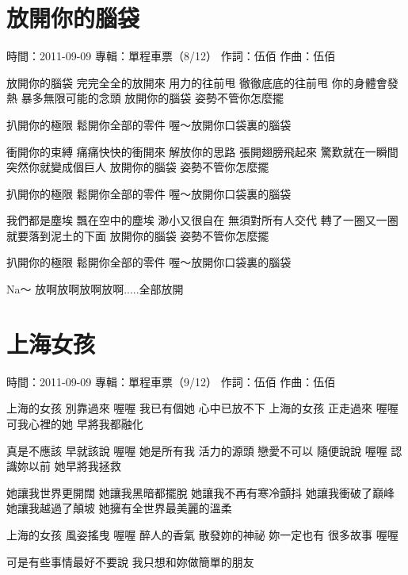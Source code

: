 \documentclass[UTF8,a4paper,oneside,twocolumn,12pt]{ctexbook}
\newcommand{\infopair}[2]{\textbullet #1：#2}
\newcommand{\zc}[1][伍佰]{\infopair{作詞}{#1}}
\newcommand{\zq}[1][伍佰]{\infopair{作曲}{#1}}
\newcommand{\zj}[1]{\infopair{專輯}{#1}}
\newcommand{\sj}[1]{\infopair{時間}{#1}}
\newenvironment{info}{\begin{flushleft}\kaishu
	}
	{\end{flushleft}\normalsize\yahei\par}
\newenvironment{lyric}{
	}
{}
\begin{document}
\section{放開你的腦袋}
\begin{info}
	\sj{2011-09-09}
	\zj{單程車票（8/12）}
	\zc
	\zq
\end{info}
\begin{lyric}
	放開你的腦袋
	完完全全的放開來
	用力的往前甩
	徹徹底底的往前甩
	你的身體會發熱
	暴多無限可能的念頭
	放開你的腦袋
	姿勢不管你怎麼擺

	扒開你的極限
	鬆開你全部的零件
	喔～放開你口袋裏的腦袋

	衝開你的束縛
	痛痛快快的衝開來
	解放你的思路
	張開翅膀飛起來
	驚歎就在一瞬間
	突然你就變成個巨人
	放開你的腦袋
	姿勢不管你怎麼擺

	扒開你的極限
	鬆開你全部的零件
	喔～放開你口袋裏的腦袋

	我們都是塵埃
	飄在空中的塵埃
	渺小又很自在
	無須對所有人交代
	轉了一圈又一圈
	就要落到泥土的下面
	放開你的腦袋
	姿勢不管你怎麼擺

	扒開你的極限
	鬆開你全部的零件
	喔～放開你口袋裏的腦袋

	Na～
	放啊放啊放啊放啊.....全部放開
\end{lyric}

\section{上海女孩}
\begin{info}
	\sj{2011-09-09}
	\zj{單程車票（9/12）}
	\zc
	\zq
\end{info}
\begin{lyric}
	上海的女孩 別靠過來 喔喔
	我已有個她 心中已放不下
	上海的女孩 正走過來 喔喔
	可我心裡的她 早將我都融化

	真是不應該 早就該說 喔喔
	她是所有我 活力的源頭
	戀愛不可以 隨便說說 喔喔
	認識妳以前 她早將我拯救

	她讓我世界更開闊
	她讓我黑暗都擺脫
	她讓我不再有寒冷顫抖
	她讓我衝破了巔峰
	她讓我越過了顛坡
	她擁有全世界最美麗的溫柔

	上海的女孩 風姿搖曳 喔喔
	醉人的香氣 散發妳的神祕
	妳一定也有 很多故事 喔喔

	可是有些事情最好不要說
	我只想和妳做簡單的朋友
\end{lyric}
\end{document}
